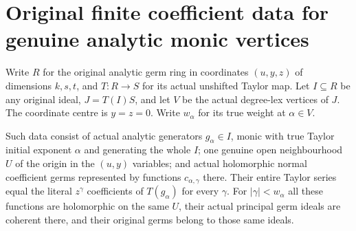 \section{Original finite coefficient data for genuine analytic monic vertices}

Write $R$ for the original analytic germ ring in coordinates $(u,y,z)$
of dimensions $k,s,t$, and $T:R\to S$ for its actual unshifted Taylor map.
Let $I\subseteq R$ be any original ideal, $J=T(I)S$, and let $V$ be the
actual degree-lex vertices of $J$. The coordinate centre is $y=z=0$.
Write $w_\alpha$ for its true weight at $\alpha\in V$.

\begin{definition}
\label{hir:actual-analytic-vertex-coefficient-data}
\leanok
Such data consist of actual analytic generators $g_\alpha\in I$, monic
with true Taylor initial exponent $\alpha$ and generating the whole $I$;
one genuine open neighbourhood $U$ of the origin in the $(u,y)$ variables;
and actual holomorphic normal coefficient germs represented by functions
$c_{\alpha,\gamma}$ there. Their entire Taylor series equal the literal
$z^\gamma$ coefficients of $T(g_\alpha)$ for every $\gamma$.
For $|\gamma|<w_\alpha$ all these functions are holomorphic on the same
$U$, their actual principal germ ideals are coherent there, and their
original germs belong to those same ideals.
\end{definition}

